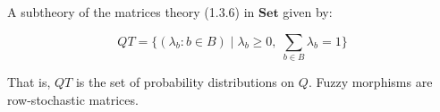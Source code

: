 A subtheory of the matrices theory (1.3.6) in $\mathbf{Set}$ given by:

$$QT = \{ (\lambda_b : b \in B) \mid \lambda_b \geqslant 0,\; \sum_{b \in B} \lambda_b = 1 \}$$

That is, $QT$ is the set of probability distributions on $Q$. Fuzzy morphisms are row-stochastic matrices.

